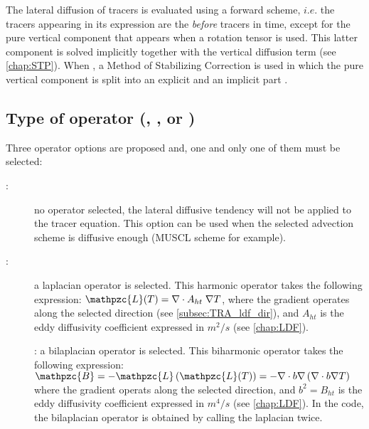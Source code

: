 \documentclass[../tex_main/NEMO_manual]{subfiles}
\begin{document}
The lateral diffusion of tracers is evaluated using a forward scheme,
$i.e.$ the tracers appearing in its expression are the \textit{before} tracers in time,
except for the pure vertical component that appears when a rotation tensor is used.
This latter component is solved implicitly together with the vertical diffusion term (see \autoref{chap:STP}).
When , a Method of Stabilizing Correction is used in which
the pure vertical component is split into an explicit and an implicit part \citep{Lemarie_OM2012}.

\subsection[Type of operator (\protect\np{ln\_traldf}\{\_NONE,\_lap,\_blp\}\})]
			     {Type of operator (\protect{}, \protect{}, or \protect{}) } 
\label{subsec:TRA_ldf_op}

Three operator options are proposed and, one and only one of them must be selected:
\begin{description}
\item[:]
  no operator selected, the lateral diffusive tendency will not be applied to the tracer equation.
  This option can be used when the selected advection scheme is diffusive enough (MUSCL scheme for example).
\item[:]
  a laplacian operator is selected.
  This harmonic operator takes the following expression:  $\mathpzc{L}(T)=\nabla \cdot A_{ht}\;\nabla T $,
  where the gradient operates along the selected direction (see \autoref{subsec:TRA_ldf_dir}),
  and $A_{ht}$ is the eddy diffusivity coefficient expressed in $m^2/s$ (see \autoref{chap:LDF}).
\item[]:
  a bilaplacian operator is selected.
  This biharmonic operator takes the following expression:
  $\mathpzc{B}=- \mathpzc{L}\left(\mathpzc{L}(T) \right) = -\nabla \cdot b\nabla \left( {\nabla \cdot b\nabla T} \right)$
  where the gradient operats along the selected direction,
  and $b^2=B_{ht}$ is the eddy diffusivity coefficient expressed in $m^4/s$  (see \autoref{chap:LDF}).
  In the code, the bilaplacian operator is obtained by calling the laplacian twice.
\end{description}
\end{document}
